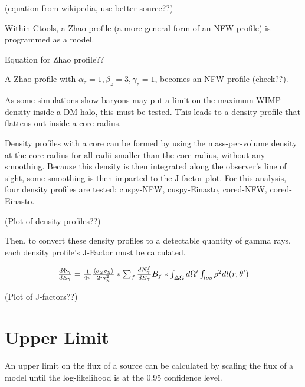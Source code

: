   (equation from wikipedia, use better source??)

  Within Ctools, a Zhao profile (a more general form of an NFW profile) is programmed as a model.

  Equation for Zhao profile??

  A Zhao profile with $ \alpha_{z} = 1 , \beta_{z} = 3 , \gamma_{z} = 1 $, becomes an NFW profile (check??).

  As some simulations show baryons may put a limit on the maximum WIMP density inside a DM halo, this must be tested.
  This leads to a density profile that flattens out inside a core radius.

  Density profiles with a core can be formed by using the mass-per-volume density at the core radius for all radii smaller than the core radius, without any smoothing.
  Because this density is then integrated along the observer's line of sight, some smoothing is then imparted to the J-factor plot.
  For this analysis, four density profiles are tested: cuspy-NFW, cuspy-Einasto, cored-NFW, cored-Einasto.

  (Plot of density profiles??)


  Then, to convert these density profiles to a detectable quantity of gamma rays, each density profile's J-Factor must be calculated.


  \begin{equation} \label{eqn:jfactor}
  $$ \frac{d \Phi_{\gamma}}{d E_{\gamma}} = \frac{1}{4\pi} \frac{ \langle \sigma_{\chi} v_{\chi} \rangle }{2 m^{2}_{\chi}} * \sum_{f} \frac{ d N_{\gamma}^{f} }{d E_{\gamma} } B_{f} * \int_{ \Delta \Omega } d \Omega' \int_{los} \rho^{2} d l( r, \theta' )  $$
  \end{equation}


  (Plot of J-factors??)

\section{Upper Limit}
  An upper limit on the flux of a source can be calculated by scaling the flux of a model until the log-likelihood is at the 0.95 confidence level.



